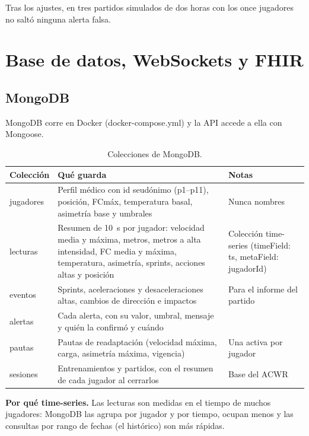 \documentclass[runningheads]{llncs}
\begin{document}
Tras los ajustes, en tres partidos simulados de dos horas con los once jugadores no saltó ninguna alerta falsa.

\section{Base de datos, WebSockets y FHIR}

\subsection{MongoDB}

MongoDB corre en Docker (docker-compose.yml) y la API accede a ella con Mongoose.

\begin{table}[!htbp]
\centering
\caption{Colecciones de MongoDB.}\label{tab:colecciones}
\footnotesize
\begin{tabularx}{\textwidth}{p{1.8cm}Lp{3.1cm}}
\toprule
\textbf{Colección} & \textbf{Qué guarda} & \textbf{Notas} \\
\midrule
jugadores & Perfil médico con id seudónimo (p1--p11), posición, FCmáx, temperatura basal, asimetría base y umbrales & Nunca nombres \\
lecturas & Resumen de 10~s por jugador: velocidad media y máxima, metros, metros a alta intensidad, FC media y máxima, temperatura, asimetría, sprints, acciones altas y posición & Colección time-series (timeField: ts, metaField: jugadorId) \\
eventos & Sprints, aceleraciones y desaceleraciones altas, cambios de dirección e impactos & Para el informe del partido \\
alertas & Cada alerta, con su valor, umbral, mensaje y quién la confirmó y cuándo & \\
pautas & Pautas de readaptación (velocidad máxima, carga, asimetría máxima, vigencia) & Una activa por jugador \\
sesiones & Entrenamientos y partidos, con el resumen de cada jugador al cerrarlos & Base del ACWR \\
\bottomrule
\end{tabularx}
\end{table}

\textbf{Por qué time-series.} Las lecturas son medidas en el tiempo de muchos jugadores: MongoDB las agrupa por jugador y por tiempo, ocupan menos y las consultas por rango de fechas (el histórico) son más rápidas.
\end{document}
